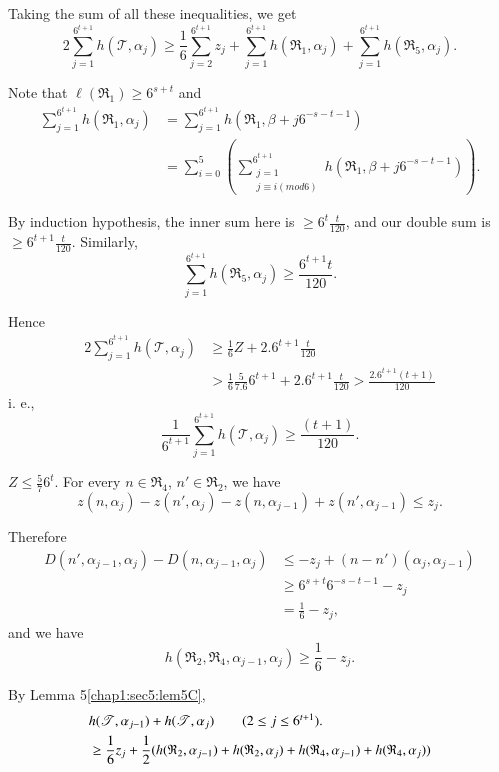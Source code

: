 Taking the sum of all these inequalities, we get
$$
2 \sum_{j=1}^{6^{t+1}} h(\mathscr{T}, \alpha_{j}) \geq \frac{1}{6} \sum_{j=2}^{6^{t+1}} z_{j} + \sum_{j=1}^{6^{t+1}} h(\mathfrak{R}_{1}, \alpha_{j}) + \sum_{j=1}^{6^{t+1}} h(\mathfrak{R}_{5}, \alpha_{j}).
$$\pageoriginale

Note that $\ell (\mathfrak{R}_{1}) \geq 6^{s+t}$ and
\begin{align*}
\sum_{j=1}^{6^{t+1}} h(\mathfrak{R}_{1}, \alpha_{j}) & = \sum_{j=1}^{6^{t+1}} h(\mathfrak{R}_{1}, \beta + j 6^{-s-t-1})\\
& = \sum_{i = 0}^{5} \left(\sum_{\substack{j=1\\j \equiv i(mod 6)}}^{6^{t+1}} h(\mathfrak{R}_{1}, \beta + j 6^{-s-t-1})\right).
\end{align*}

By induction hypothesis, the inner sum here is $\geq 6^{t} \frac{t}{120}$, and our double sum is $\geq 6^{t+1} \frac{t}{120}$. Similarly,
$$
\sum_{j=1}^{6^{t+1}} h(\mathfrak{R}_{5}, \alpha_{j}) \geq \frac{6^{t+1}t}{120}.
$$

Hence 
\begin{align*}
2 \sum_{j = 1}^{6^{t+1}} h(\mathscr{T}, \alpha_{j}) & \geq \frac{1}{6} Z + 2.6^{t+1} \frac{t}{120}\\
& > \frac{1}{6} \frac{5}{7.6} 6^{t+1} + 2.6^{t+1} \frac{t}{120} > \frac{2.6^{t+1}(t+1)}{120}
\end{align*}
i. e.,
$$
\frac{1}{6^{t+1}} \sum_{j = 1}^{6^{t+1}} h(\mathscr{T}, \alpha_{j}) \geq \frac{(t+1)}{120}.
$$

\medskip
{} $Z \leq \frac{5}{7} 6^{t}$. For every $n \in \mathfrak{R}_{4}$, $n' \in \mathfrak{R}_{2}$, we have
$$
z(n, \alpha_{j}) - z(n', \alpha_{j}) - z(n, \alpha_{j-1}) + z(n', \alpha_{j-1}) \leq z_{j}.
$$

Therefore 
\begin{align*} 
D(n', \alpha_{j-1}, \alpha_{j}) - D(n, \alpha_{j-1}, \alpha_{j}) & \leq -z_{j} + (n - n') (\alpha_{j}, \alpha_{j-1})\\ 
& \geq 6^{s+t} 6^{-s-t-1} - z_{j}\\ 
& = \frac{1}{6} - z_{j},
\end{align*}\pageoriginale 
and we have
$$
h(\mathfrak{R}_{2}, \mathfrak{R}_{4}, \alpha_{j-1}, \alpha_{j}) \geq \frac{1}{6} - z_{j}.
$$

By Lemma 5\ref{chap1:sec5:lem5C},
\begin{align*}
& h(\mathscr{T}, \alpha_{j-1}) + h(\mathscr{T}, \alpha_{j})\tag*{$(2 \leq j \leq 6^{t+1})$}.\\
& \geq \frac{1}{6} z_{j} + \frac{1}{2} (h(\mathfrak{R}_{2}, \alpha_{j-1}) + h(\mathfrak{R}_{2}, \alpha_{j}) + h(\mathfrak{R}_{4}, \alpha_{j-1}) + h(\mathfrak{R}_{4}, \alpha_{j}))
\end{align*}

